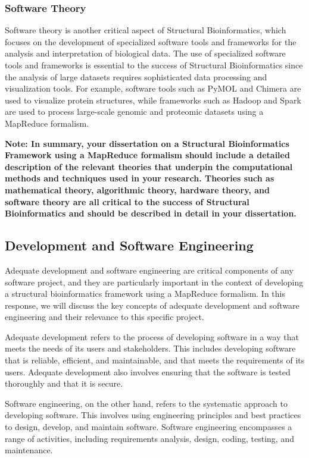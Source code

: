 \documentclass[]{final_report}
\begin{document}
\subsubsection{Software Theory}
Software theory is another critical aspect of Structural Bioinformatics, which focuses on the development of specialized software tools and frameworks for the analysis and interpretation of biological data. The use of specialized software tools and frameworks is essential to the success of Structural Bioinformatics since the analysis of large datasets requires sophisticated data processing and visualization tools. For example, software tools such as PyMOL and Chimera are used to visualize protein structures, while frameworks such as Hadoop and Spark are used to process large-scale genomic and proteomic datasets using a MapReduce formalism.

\textbf{Note: In summary, your dissertation on a Structural Bioinformatics Framework using a MapReduce formalism should include a detailed description of the relevant theories that underpin the computational methods and techniques used in your research. Theories such as mathematical theory, algorithmic theory, hardware theory, and software theory are all critical to the success of Structural Bioinformatics and should be described in detail in your dissertation.}


\subsection{Development and Software Engineering}

Adequate development and software engineering are critical components of any software project, and they are particularly important in the context of developing a structural bioinformatics framework using a MapReduce formalism. In this response, we will discuss the key concepts of adequate development and software engineering and their relevance to this specific project.

Adequate development refers to the process of developing software in a way that meets the needs of its users and stakeholders. This includes developing software that is reliable, efficient, and maintainable, and that meets the requirements of its users. Adequate development also involves ensuring that the software is tested thoroughly and that it is secure.

Software engineering, on the other hand, refers to the systematic approach to developing software. This involves using engineering principles and best practices to design, develop, and maintain software. Software engineering encompasses a range of activities, including requirements analysis, design, coding, testing, and maintenance.
\end{document}
